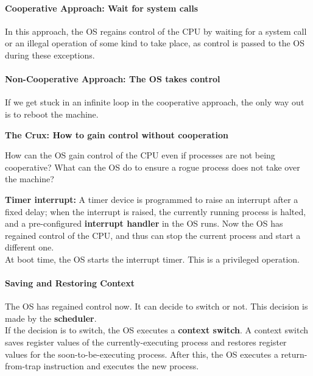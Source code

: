 \paragraph{Cooperative Approach: Wait for system calls}

In this approach, the OS regains control of the CPU by waiting for a 
system call or an illegal operation of some kind to take place, as
control is passed to the OS during these exceptions.

\paragraph{Non-Cooperative Approach: The OS takes control}

If we get stuck in an infinite loop in the cooperative approach, the only way
out is to reboot the machine.\\

\begin{tcolorbox}
    \textbf{The Crux: How to gain control without cooperation} 

    How can the OS gain control of the CPU even if processes are not being
    cooperative? What can the OS do to ensure a rogue process does not take over
    the machine?\\
\end{tcolorbox}

\textbf{Timer interrupt:} A timer device is programmed to raise an interrupt
after a fixed delay; when the interrupt is raised, the currently running
process is halted, and a pre-configured \textbf{interrupt handler} in the OS
runs. Now the OS has regained control of the CPU, and thus can stop the 
current process and start a different one.\\

At boot time, the OS starts the interrupt timer. This is a privileged
operation.

\paragraph{Saving and Restoring Context}

The OS has regained control now. It can decide to switch or not. This decision
is made by the \textbf{scheduler}.\\

If the decision is to switch, the OS executes a \textbf{context switch}. A
context switch saves register values of the currently-executing process and
restores register values for the soon-to-be-executing process. After this, 
the OS executes a return-from-trap instruction and executes the new process.\\

